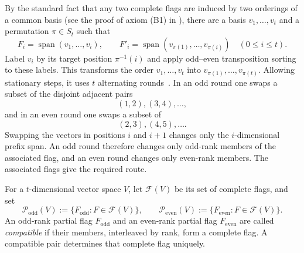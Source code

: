 \documentclass[11pt]{article}
\makeatletter
\theoremstyle{plain}
\theoremstyle{definition}
\renewenvironment{proof}[1][\proofname]
{\par\pushQED{\qed}
	\normalfont\topsep6\p@\@plus6\p@\relax\trivlist
	\item[\hskip\labelsep\bfseries#1\@addpunct{.}]
	\ignorespaces}
{\popQED\endtrivlist\@endpefalse}
\makeatother
\begin{document}
\begin{proof}

By the standard fact that any two complete flags are induced by two orderings of a common basis (see the proof of axiom {\rm (B1)} in \cite[Section~4.3, pp.~183--184]{AB}), there are a basis $v_1,\ldots,v_t$ and a permutation $\pi\in S_t$ such that
$$  F_i=\operatorname{span}(v_1,\ldots,v_i),\qquad
  F'_i=\operatorname{span}(v_{\pi(1)},\ldots,v_{\pi(i)})
  \quad(0\le i\le t).$$
Label $v_i$ by its target position $\pi^{-1}(i)$ and apply odd--even transposition sorting to these labels. This transforms the order $v_1,\ldots,v_t$ into $v_{\pi(1)},\ldots,v_{\pi(t)}$. Allowing stationary steps, it uses $t$ alternating rounds~\cite[p.~518]{ACG}. In an odd round one swaps a subset of the disjoint adjacent pairs
$$(1,2),(3,4),\ldots,$$
and in an even round one swaps a subset of
$$(2,3),(4,5),\ldots.$$
Swapping the vectors in positions $i$ and $i+1$ changes only the
$i$-dimensional prefix span.  An odd round therefore changes only odd-rank members of the associated flag, and an even round changes only even-rank members.  The associated flags give the required route.
\end{proof}

For a $t$-dimensional vector space $V$, let $\mathcal F(V)$ be its set of
complete flags, and set
$$\mathcal P_{\mathrm{odd}}(V)
  :=\{F_{\mathrm{odd}}:F\in\mathcal F(V)\},
  \qquad
  \mathcal P_{\mathrm{even}}(V)
  :=\{F_{\mathrm{even}}:F\in\mathcal F(V)\}.$$
An odd-rank partial flag $F_{\mathrm{odd}}$ and an even-rank partial flag $F_{\mathrm{even}}$ are called \emph{compatible} if their members, interleaved by rank, form a complete flag.  A compatible pair determines that complete flag uniquely.
\end{document}

